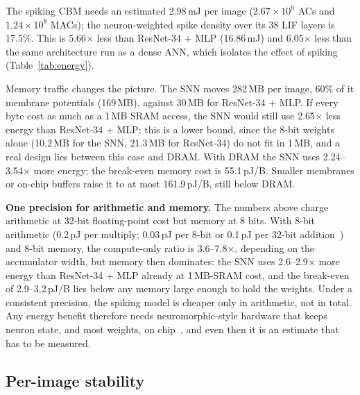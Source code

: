 \documentclass[conference]{IEEEtran}
\begin{document}
The spiking CBM needs an estimated 2.98\,mJ per image ($2.67\times10^9$ ACs and $1.24\times10^8$ MACs); the neuron-weighted spike density over its 38 LIF layers is 17.5\%. This is 5.66$\times$ less than ResNet-34 + MLP (16.86\,mJ) and 6.05$\times$ less than the same architecture run as a dense ANN, which isolates the effect of spiking (Table~\ref{tab:energy}).

Memory traffic changes the picture. The SNN moves 282\,MB per image, 60\% of it membrane potentials (169\,MB), against 30\,MB for ResNet-34 + MLP. If every byte cost as much as a 1\,MB SRAM access, the SNN would still use 2.65$\times$ less energy than ResNet-34 + MLP; this is a lower bound, since the 8-bit weights alone (10.2\,MB for the SNN, 21.3\,MB for ResNet-34) do not fit in 1\,MB, and a real design lies between this case and DRAM. With DRAM the SNN uses 2.24--3.54$\times$ more energy; the break-even memory cost is 55.1\,pJ/B. Smaller membranes or on-chip buffers raise it to at most 161.9\,pJ/B, still below DRAM.

\textbf{One precision for arithmetic and memory.} The numbers above charge arithmetic at 32-bit floating-point cost but memory at 8 bits. With 8-bit arithmetic (0.2\,pJ per multiply; 0.03\,pJ per 8-bit or 0.1\,pJ per 32-bit addition~\cite{horowitz2014computing}) and 8-bit memory, the compute-only ratio is 3.6--7.8$\times$, depending on the accumulator width, but memory then dominates: the SNN uses 2.6--2.9$\times$ more energy than ResNet-34 + MLP already at 1\,MB-SRAM cost, and the break-even of 2.9--3.2\,pJ/B lies below any memory large enough to hold the weights. Under a consistent precision, the spiking model is cheaper only in arithmetic, not in total. Any energy benefit therefore needs neuromorphic-style hardware that keeps neuron state, and most weights, on chip~\cite{dampfhoffer2023snns,davies2018loihi}, and even then it is an estimate that has to be measured.

\subsection{Per-image stability}\label{sec:stab}
\end{document}
